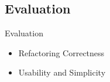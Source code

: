 \documentclass[xcolor=dvipsnames, 14pt]{beamer}
\begin{document}
\subsection{Evaluation}
\begin{frame}{Evaluation}

\begin{itemize}
  \setlength\itemsep{2em}
\item Refactoring Correctness
\item Usability and Simplicity
\end{itemize}
\end{frame}


\end{document}
